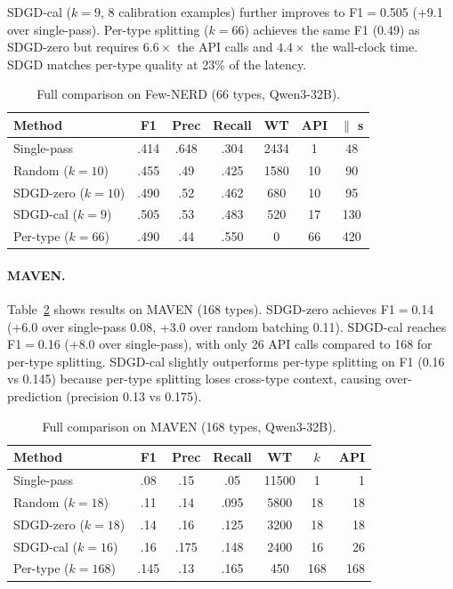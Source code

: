 \documentclass[11pt,a4paper]{article}
\begin{document}
SDGD-cal ($k{=}9$, 8 calibration examples) further improves to F1$=$0.505 (+9.1 over single-pass).
Per-type splitting ($k{=}66$) achieves the same F1 (0.49) as SDGD-zero but requires $6.6\times$ the API calls and $4.4\times$ the wall-clock time.
SDGD matches per-type quality at 23\% of the latency.

\begin{table}[t]
\centering
\small
\caption{Full comparison on Few-NERD (66 types, Qwen3-32B).}
\label{tab:sdgd_fewnerd}
\begin{tabular}{lcccccc}
\toprule
\textbf{Method} & \textbf{F1} & \textbf{Prec} & \textbf{Recall} & \textbf{WT} & \textbf{API} & \textbf{$\parallel$ s} \\
\midrule
Single-pass       & .414 & .648 & .304 & 2434 & 1  & 48 \\
Random ($k{=}10$) & .455 & .49  & .425 & 1580 & 10 & 90 \\
SDGD-zero ($k{=}10$) & .490 & .52  & .462 & 680  & 10 & 95 \\
SDGD-cal ($k{=}9$)   & .505 & .53  & .483 & 520  & 17 & 130 \\
Per-type ($k{=}66$)   & .490 & .44  & .550 & 0    & 66 & 420 \\
\bottomrule
\end{tabular}
\end{table}

\paragraph{MAVEN.}
Table~\ref{tab:sdgd_maven} shows results on MAVEN (168 types).
SDGD-zero achieves F1$=$0.14 (+6.0 over single-pass 0.08, +3.0 over random batching 0.11).
SDGD-cal reaches F1$=$0.16 (+8.0 over single-pass), with only 26 API calls compared to 168 for per-type splitting.
SDGD-cal slightly outperforms per-type splitting on F1 (0.16 vs 0.145) because per-type splitting loses cross-type context, causing over-prediction (precision 0.13 vs 0.175).

\begin{table}[t]
\centering
\small
\caption{Full comparison on MAVEN (168 types, Qwen3-32B).}
\label{tab:sdgd_maven}
\begin{tabular}{lcccccr}
\toprule
\textbf{Method} & \textbf{F1} & \textbf{Prec} & \textbf{Recall} & \textbf{WT} & \textbf{$k$} & \textbf{API} \\
\midrule
Single-pass        & .08  & .15  & .05  & 11500 & 1   & 1 \\
Random ($k{=}18$)  & .11  & .14  & .095 & 5800  & 18  & 18 \\
SDGD-zero ($k{=}18$) & .14  & .16  & .125 & 3200  & 18  & 18 \\
SDGD-cal ($k{=}16$)  & .16  & .175 & .148 & 2400  & 16  & 26 \\
Per-type ($k{=}168$)  & .145 & .13  & .165 & 450   & 168 & 168 \\
\bottomrule
\end{tabular}
\end{table}
\end{document}
